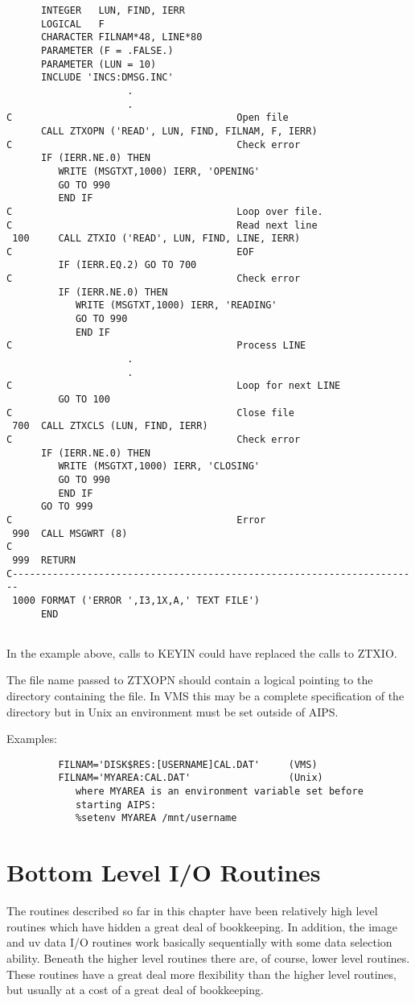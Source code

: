 \begin{verbatim}
      INTEGER   LUN, FIND, IERR
      LOGICAL   F
      CHARACTER FILNAM*48, LINE*80
      PARAMETER (F = .FALSE.)
      PARAMETER (LUN = 10)
      INCLUDE 'INCS:DMSG.INC'
                     .
                     .
C                                       Open file
      CALL ZTXOPN ('READ', LUN, FIND, FILNAM, F, IERR)
C                                       Check error
      IF (IERR.NE.0) THEN
         WRITE (MSGTXT,1000) IERR, 'OPENING'
         GO TO 990
         END IF
C                                       Loop over file.
C                                       Read next line
 100     CALL ZTXIO ('READ', LUN, FIND, LINE, IERR)
C                                       EOF
         IF (IERR.EQ.2) GO TO 700
C                                       Check error
         IF (IERR.NE.0) THEN
            WRITE (MSGTXT,1000) IERR, 'READING'
            GO TO 990
            END IF
C                                       Process LINE
                     .
                     .
C                                       Loop for next LINE
         GO TO 100
C                                       Close file
 700  CALL ZTXCLS (LUN, FIND, IERR)
C                                       Check error
      IF (IERR.NE.0) THEN
         WRITE (MSGTXT,1000) IERR, 'CLOSING'
         GO TO 990
         END IF
      GO TO 999
C                                       Error
 990  CALL MSGWRT (8)
C
 999  RETURN
C-----------------------------------------------------------------------
 1000 FORMAT ('ERROR ',I3,1X,A,' TEXT FILE')
      END


\end{verbatim}
In the example above, calls to KEYIN could have replaced the calls to
ZTXIO.

The file name passed to ZTXOPN should contain a logical pointing to
the directory containing the file.  In VMS this may be a complete
specification of the directory but in Unix an environment must be set
outside of AIPS.

Examples:
\begin{verbatim}
         FILNAM='DISK$RES:[USERNAME]CAL.DAT'     (VMS)
         FILNAM='MYAREA:CAL.DAT'                 (Unix)
            where MYAREA is an environment variable set before
            starting AIPS:
            %setenv MYAREA /mnt/username
\end{verbatim}

\section{Bottom Level I/O Routines}
The routines described so far in this chapter have been relatively
high level routines which have hidden a great deal of bookkeeping.  In
addition, the image and uv data I/O routines work basically
sequentially with some data selection ability.  Beneath the higher
level routines there are, of course, lower level routines. These
routines have a great deal more flexibility than the higher level
routines, but usually at a cost of a great deal of bookkeeping.

